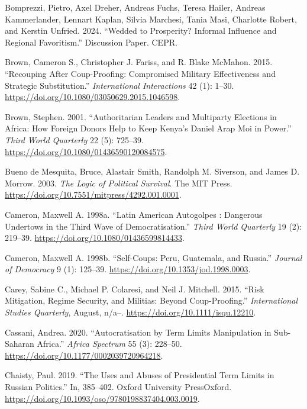 \documentclass[
  12pt,
]{report}
\newlength{\cslhangindent}
\newenvironment{CSLReferences}[2] %
 {\begin{list}{}{%
  \setlength{\itemindent}{0pt}
  \setlength{\leftmargin}{0pt}
  \setlength{\parsep}{0pt}
  \ifodd #1
   \setlength{\leftmargin}{\cslhangindent}
   \setlength{\itemindent}{-1\cslhangindent}
  \fi
  \setlength{\itemsep}{#2\baselineskip}}}
 {\end{list}}
\begin{document}
\begin{CSLReferences}{1}{0}
Bomprezzi, Pietro, Axel Dreher, Andreas Fuchs, Teresa Hailer, Andreas
Kammerlander, Lennart Kaplan, Silvia Marchesi, Tania Masi, Charlotte
Robert, and Kerstin Unfried. 2024. {``Wedded to Prosperity? Informal
Influence and Regional Favoritism.''} Discussion Paper. CEPR.

Brown, Cameron S., Christopher J. Fariss, and R. Blake McMahon. 2015.
{``Recouping After Coup-Proofing: Compromised Military Effectiveness and
Strategic Substitution.''} \emph{International Interactions} 42 (1):
1--30. \url{https://doi.org/10.1080/03050629.2015.1046598}.

Brown, Stephen. 2001. {``Authoritarian Leaders and Multiparty Elections
in Africa: How Foreign Donors Help to Keep Kenya's Daniel Arap Moi in
Power.''} \emph{Third World Quarterly} 22 (5): 725--39.
\url{https://doi.org/10.1080/01436590120084575}.

Bueno de Mesquita, Bruce, Alastair Smith, Randolph M. Siverson, and
James D. Morrow. 2003. \emph{The Logic of Political Survival}. The MIT
Press. \url{https://doi.org/10.7551/mitpress/4292.001.0001}.

Cameron, Maxwell A. 1998a. {``Latin American Autogolpes : Dangerous
Undertows in the Third Wave of Democratisation.''} \emph{Third World
Quarterly} 19 (2): 219--39.
\url{https://doi.org/10.1080/01436599814433}.

Cameron, Maxwell A. 1998b. {``Self-Coups: Peru, Guatemala, and
Russia.''} \emph{Journal of Democracy} 9 (1): 125--39.
\url{https://doi.org/10.1353/jod.1998.0003}.

Carey, Sabine C., Michael P. Colaresi, and Neil J. Mitchell. 2015.
{``Risk Mitigation, Regime Security, and Militias: Beyond
Coup-Proofing.''} \emph{International Studies Quarterly}, August, n/a--.
\url{https://doi.org/10.1111/isqu.12210}.

Cassani, Andrea. 2020. {``Autocratisation by Term Limits Manipulation in
Sub-Saharan Africa.''} \emph{Africa Spectrum} 55 (3): 228--50.
\url{https://doi.org/10.1177/0002039720964218}.

Chaisty, Paul. 2019. {``The Uses and Abuses of Presidential Term Limits
in Russian Politics.''} In, 385--402. Oxford University PressOxford.
\url{https://doi.org/10.1093/oso/9780198837404.003.0019}.


\end{CSLReferences}
\end{document}
